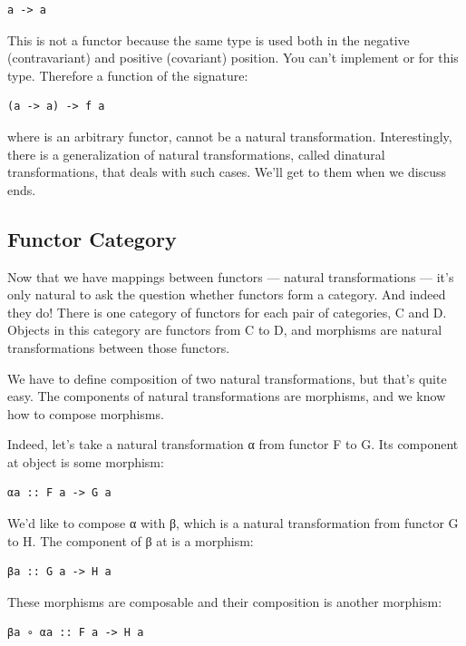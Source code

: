\begin{verbatim}
a -> a
\end{verbatim}

This is not a functor because the same type  is used both in
the negative (contravariant) and positive (covariant) position. You
can't implement  or  for this type.
Therefore a function of the signature:

\begin{verbatim}
(a -> a) -> f a
\end{verbatim}

where  is an arbitrary functor, cannot be a natural
transformation. Interestingly, there is a generalization of natural
transformations, called dinatural transformations, that deals with such
cases. We'll get to them when we discuss ends.

\subsection{Functor Category}\label{functor-category}

Now that we have mappings between functors --- natural transformations
--- it's only natural to ask the question whether functors form a
category. And indeed they do! There is one category of functors for each
pair of categories, C and D. Objects in this category are functors from
C to D, and morphisms are natural transformations between those
functors.

We have to define composition of two natural transformations, but that's
quite easy. The components of natural transformations are morphisms, and
we know how to compose morphisms.

Indeed, let's take a natural transformation α from functor F to G. Its
component at object  is some morphism:

\begin{verbatim}
αa :: F a -> G a
\end{verbatim}

We'd like to compose α with β, which is a natural transformation from
functor G to H. The component of β at  is a morphism:

\begin{verbatim}
βa :: G a -> H a
\end{verbatim}

These morphisms are composable and their composition is another
morphism:

\begin{verbatim}
βa ∘ αa :: F a -> H a
\end{verbatim}


